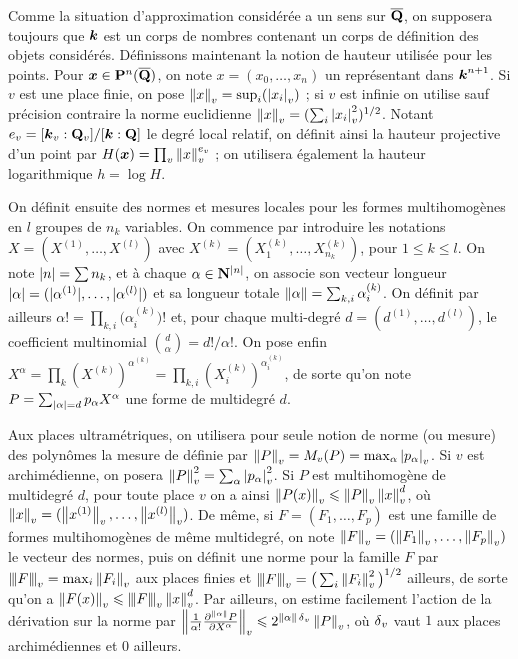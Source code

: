 \documentclass{mpg-preth}
\begin{document}
\pagebreak[3]

Comme la situation d'approximation considérée a un sens sur $\overline{\mathbf{Q}}$, on
supposera toujours que $\boldsymbol{k}$ est un corps de nombres contenant un corps de
définition des objets considérés. Définissons maintenant la notion de hauteur
utilisée pour les points. Pour $\boldsymbol{x} \in \mathbf{P}^n(\overline{\mathbf{Q}})$, on note $x = (x_0,
\dots, x_n)$ un représentant dans $\boldsymbol{k}^{n+1}$. Si $v$ est une place finie, on
pose $\left\lVert x\right\rVert_{v} = \sup_i(\left\lvert x_i\right\rvert_{v})$ ; si $v$ est infinie on utilise sauf précision
contraire la norme euclidienne $\left\lVert x\right\rVert_{v} = ( \sum_i \left\lvert x_i\right\rvert_{v}^2 )^{1/2}$. Notant
$e_v = [\boldsymbol{k}_v : \mathbf{Q}_v]/[\boldsymbol{k} : \mathbf{Q}]$ le degré local relatif, on définit ainsi
la hauteur projective d'un point par $H(\boldsymbol{x}) = \prod_v \left\lVert x\right\rVert_{v}^{e_v}$ ; on
utilisera également la hauteur logarithmique $h = \log H$.

On définit ensuite des normes et mesures locales pour les formes
multihomogènes en $l$ groupes de $n_k$ variables. On commence par introduire
les notations $X = (X^{(1)}, \dots, X^{(l)})$ avec $X^{(k)} = (X^{(k)}_1,
\dots, X^{(k)}_{n_k})$, pour $1 \le k \le l$. On note ${\lvert n\rvert} = \sum n_k$, et
à chaque $\alpha \in \mathbf{N}^{{\lvert n\rvert}}$, on associe son vecteur longueur
${\lvert\alpha\rvert} = ({\lvert\alpha^{(1)}\rvert}, \dots, {\lvert\alpha^{(l)}\rvert})$ et sa longueur
totale $\lVert\alpha\rVert = \sum_{k, i} \alpha^{(k)}_i$. On définit par ailleurs
$\alpha ! = \prod_{k, i} \big(\alpha^{(k)}_i\big)!$ et, pour chaque
multi-degré $d = (d^{(1)}, \dots, d^{(l)})$, le coefficient multinomial
$\binom{d}{\alpha} = d!/\alpha!$. On pose enfin $X^\alpha = \prod_k
(X^{(k)})^{\alpha^{(k)}} = \prod_{k, i} (X^{(k)}_i)^{\alpha^{(k)}_i}$, de
sorte qu'on note $P = \sum_{{\lvert\alpha\rvert} = d} p_\alpha X^\alpha$ une forme de
multidegré $d$.

Aux places ultramétriques, on utilisera pour seule notion de norme (ou mesure)
des polynômes la mesure de  définie par $\left\lVert P\right\rVert_{v} = M_{v}(P) =
\max_\alpha \left\lvert p_\alpha\right\rvert_{v}$. Si $v$ est archimédienne, on posera $\left\lVert P\right\rVert_{v} ^2 =
\sum_\alpha \left\lvert p_\alpha\right\rvert_{v}^2$. Si $P$ est multihomogène de multidegré $d$, pour
toute place $v$ on a ainsi $\left\lVert P(x)\right\rVert_{v} \leqslant \left\lVert P\right\rVert_{v} \left\lVert x\right\rVert_{v} ^d$, où $\left\lVert x\right\rVert_{v} =
(\left\lVert x^{(1)}\right\rVert_{v}, \dots , \left\lVert x^{(l)}\right\rVert_{v})$. De même, si $F = (F_1, \dots, F_p)$ est
une famille de formes multihomogènes de même multidegré, on note $\left\lVert F\right\rVert_{v} =
(\left\lVert F_1\right\rVert_{v}, \dots, \left\lVert F_p\right\rVert_{v})$ le vecteur des normes, puis on définit une norme
pour la famille $F$ par $\left\lvert\hspace{-1pt}\left\lvert\hspace{-1pt} \left\lvert F\right\rvert \hspace{-1pt}\right\rvert\hspace{-1pt}\right\rvert_{v} = \max_i \left\lVert F_i\right\rVert_{v}$ aux places finies et $\left\lvert\hspace{-1pt}\left\lvert\hspace{-1pt} \left\lvert F\right\rvert \hspace{-1pt}\right\rvert\hspace{-1pt}\right\rvert_{v} = \big(\sum_i \left\lVert F_i\right\rVert_{v}^2 \big)^{1/2}$ ailleurs, de sorte qu'on a $\left\lVert F(x)\right\rVert_{v}
\leqslant \left\lvert\hspace{-1pt}\left\lvert\hspace{-1pt} \left\lvert F\right\rvert \hspace{-1pt}\right\rvert\hspace{-1pt}\right\rvert_{v} \left\lVert x\right\rVert_{v}^d$. Par ailleurs, on estime facilement l'action de la
dérivation sur la norme par $\left\lVert\frac1 {\alpha !}
  \frac{\partial^{\lVert\alpha\rVert}P}{\partial X^\alpha}\right\rVert_{v} \leqslant 2^{\lVert\alpha\rVert \, {\delta\smash{_v}}}
\left\lVert P\right\rVert_{v}$, où ${\delta\smash{_v}}$ vaut $1$ aux places archimédiennes et $0$ ailleurs.
\end{document}
